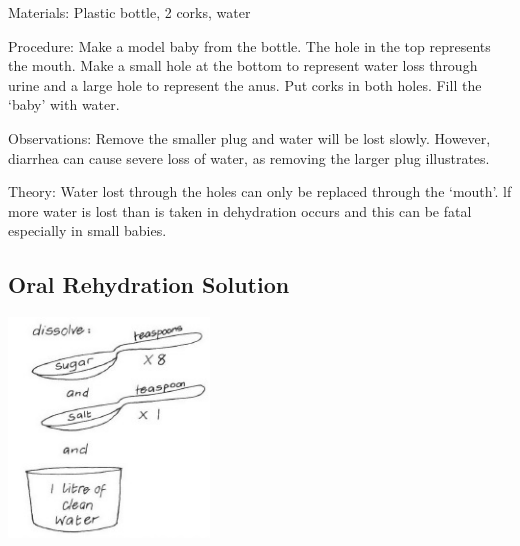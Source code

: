 \begin{multicols}{2}
\begin{description*}
\item[Materials:]{Plastic bottle, 2 corks, water}
\item[Procedure:]{Make a model baby from the bottle. The hole in the top
represents the mouth. Make
a small hole at the bottom to represent water loss through urine and a large hole
to represent the anus. Put corks in both holes. Fill the `baby' with
water. }
\item[Observations:]{Remove the smaller plug and
water will be lost slowly.
However, diarrhea can cause
severe loss of water, as removing
the larger plug illustrates. }
\item[Theory:]{Water
lost through the holes can only be
replaced through the `mouth'. lf more water is lost than is taken in dehydration occurs and this can
be fatal especially in small babies.}
\end{description*}

\subsection{Oral Rehydration Solution}

\begin{center}
\includegraphics[width=0.4\textwidth]{./img/vso/ors.jpg}
\end{center}


\end{multicols}
